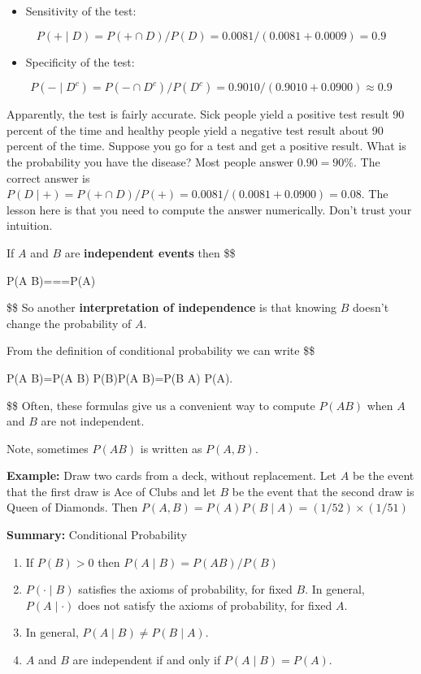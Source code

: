 \documentclass[
  letterpaper,
  DIV=11,
  numbers=noendperiod]{scrreprt}
\providecommand{\tightlist}{%
  \setlength{\itemsep}{0pt}\setlength{\parskip}{0pt}}\usepackage{longtable,booktabs,array}
\theoremstyle{definition}
\theoremstyle{plain}
\theoremstyle{plain}
\theoremstyle{remark}
\begin{document}
\begin{itemize}
\tightlist
\item
  Sensitivity of the test:
\end{itemize}

\[P(+\mid D)=P(+\cap D) / P(D)=0.0081 /(0.0081+0.0009)=0.9\]

\begin{itemize}
\tightlist
\item
  Specificity of the test:
\end{itemize}

\[P(-\mid D^{c})=P(-\cap D^{c}) / P(D^{c})=0.9010/(0.9010+0.0900)\approx 0.9\]

Apparently, the test is fairly accurate. Sick people yield a positive
test result 90 percent of the time and healthy people yield a negative
test result about 90 percent of the time. Suppose you go for a test and
get a positive result. What is the probability you have the disease?
Most people answer \(0.90=90\%\). The correct answer is
\(P(D \mid+)=P(+\cap D) / P(+)=0.0081 /(0.0081+0.0900)=0.08\). The
lesson here is that you need to compute the answer numerically. Don't
trust your intuition.

If \(A\) and \(B\) are \textbf{independent events} then \$\$

P(A \mid B)===P(A)

\$\$ So another \textbf{interpretation of independence} is that knowing
\(B\) doesn't change the probability of \(A\).

From the definition of conditional probability we can write \$\$

P(A B)=P(A \mid B) P(B)\quad{}\quad P(A B)=P(B \mid A)
P(A).

\$\$ Often, these formulas give us a convenient way to compute
\(P(A B)\) when \(A\) and \(B\) are not independent.

Note, sometimes \(P(A B)\) is written as \(P(A,B)\).

\textbf{Example:} Draw two cards from a deck, without replacement. Let
\(A\) be the event that the first draw is Ace of Clubs and let \(B\) be
the event that the second draw is Queen of Diamonds. Then
\(P(A, B)=P(A) P(B \mid A)=(1 / 52) \times(1 / 51)\)

\textbf{Summary:} Conditional Probability

\begin{enumerate}
\def\labelenumi{\arabic{enumi}.}
\tightlist
\item
  If \(P(B)>0\) then \(P(A \mid B)=P(A B)/P(B)\)
\item
  \(P(\cdot \mid B)\) satisfies the axioms of probability, for fixed
  \(B\). In general, \(P(A \mid \cdot)\) does not satisfy the axioms of
  probability, for fixed \(A\).
\item
  In general, \(P(A \mid B) \neq P(B \mid A)\).
\item
  \(A\) and \(B\) are independent if and only if \(P(A \mid B)=P(A)\).
\end{enumerate}
\end{document}
